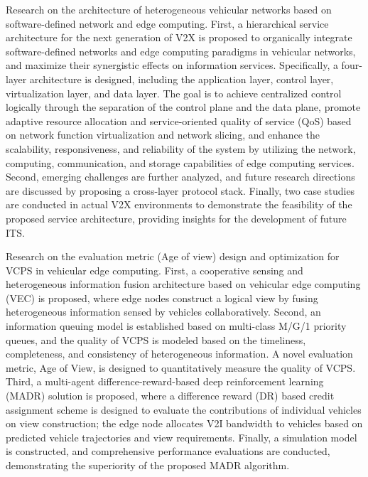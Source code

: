 \begin{eabstract}
 Research on the architecture of heterogeneous vehicular networks based on software-defined network and edge computing.
First, a hierarchical service architecture for the next generation of V2X is proposed to organically integrate software-defined networks and edge computing paradigms in vehicular networks, and maximize their synergistic effects on information services. 
Specifically, a four-layer architecture is designed, including the application layer, control layer, virtualization layer, and data layer. 
The goal is to achieve centralized control logically through the separation of the control plane and the data plane, promote adaptive resource allocation and service-oriented quality of service (QoS) based on network function virtualization and network slicing, and enhance the scalability, responsiveness, and reliability of the system by utilizing the network, computing, communication, and storage capabilities of edge computing services. 
Second, emerging challenges are further analyzed, and future research directions are discussed by proposing a cross-layer protocol stack. 
Finally, two case studies are conducted in actual V2X environments to demonstrate the feasibility of the proposed service architecture, providing insights for the development of future ITS.

 Research on the evaluation metric (Age of view) design and optimization for VCPS in vehicular edge computing.
First, a cooperative sensing and heterogeneous information fusion architecture based on vehicular edge computing (VEC) is proposed, where edge nodes construct a logical view by fusing heterogeneous information sensed by vehicles collaboratively. 
Second, an information queuing model is established based on multi-class M/G/1 priority queues, and the quality of VCPS is modeled based on the timeliness, completeness, and consistency of heterogeneous information. 
A novel evaluation metric, Age of View, is designed to quantitatively measure the quality of VCPS. 
Third, a multi-agent difference-reward-based deep reinforcement learning (MADR) solution is proposed, where a difference reward (DR) based credit assignment scheme is designed to evaluate the contributions of individual vehicles on view construction; the edge node allocates V2I bandwidth to vehicles based on predicted vehicle trajectories and view requirements. 
Finally, a simulation model is constructed, and comprehensive performance evaluations are conducted, demonstrating the superiority of the proposed MADR algorithm.


\end{eabstract}
